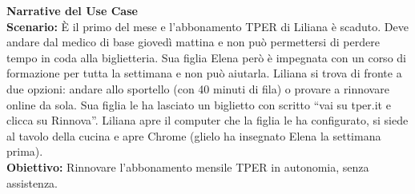 \documentclass[11pt,a4paper]{article}
\begin{document}
\begin{tcolorbox}[colback=backgroundColor,colframe=borderColor,arc=2mm]
    \textbf{Narrative del Use Case} \\[4pt]
    {\small
    \textbf{Scenario:} È il primo del mese e l'abbonamento TPER di Liliana è scaduto. Deve andare dal medico di base giovedì mattina e non può permettersi di perdere tempo in coda alla biglietteria. Sua figlia Elena però è impegnata con un corso di formazione per tutta la settimana e non può aiutarla. Liliana si trova di fronte a due opzioni: andare allo sportello (con 40 minuti di fila) o provare a rinnovare online da sola. Sua figlia le ha lasciato un biglietto con scritto ``vai su tper.it e clicca su Rinnova''. Liliana apre il computer che la figlia le ha configurato, si siede al tavolo della cucina e apre Chrome (glielo ha insegnato Elena la settimana prima). \\[4pt]

    \textbf{Obiettivo:} Rinnovare l'abbonamento mensile TPER in autonomia, senza assistenza. \\[4pt]

}
\end{tcolorbox}
\end{document}
